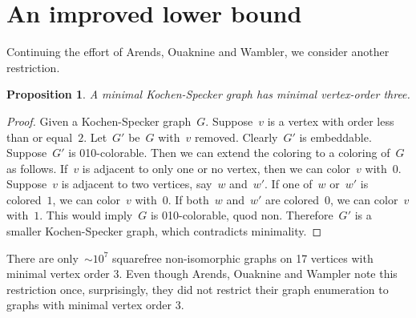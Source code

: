 \documentclass[adraft,copyright,creativecommons]{eptcs}
\newcounter{main}
\newtheorem{prop}[main]{Proposition}
\theoremstyle{definition}
\theoremstyle{remark}
\begin{document}
\section{An improved lower bound}
\label{sec:ilb}
Continuing the effort of Arends, Ouaknine and Wambler,
we consider another restriction.
\begin{prop}
    A minimal Kochen-Specker graph has minimal vertex-order three.
\end{prop}
\begin{proof}
    Given a Kochen-Specker graph~$G$.
    Suppose~$v$ is a vertex with order less than or equal~$2$.
    Let~$G'$ be~$G$ with~$v$ removed.
    Clearly~$G'$ is embeddable.
    Suppose~$G'$ is 010-colorable.
    Then we can extend the coloring to a coloring of~$G$ as follows.
    If~$v$ is adjacent to only one or no vertex,
    then we can color~$v$ with~$0$.
    Suppose~$v$ is adjacent to two vertices, say~$w$ and~$w'$.
    If one of~$w$ or~$w'$ is colored~$1$, we can color~$v$ with~$0$.
    If both~$w$ and~$w'$ are colored~$0$, we can color~$v$ with~$1$.
    This would imply~$G$ is 010-colorable, quod non.
    Therefore~$G'$ is a smaller
    Kochen-Specker graph, which contradicts minimality.
\end{proof}
There are only~${\sim}10^7$
squarefree non-isomorphic graphs on 17 vertices with minimal vertex order 3.
Even though Arends, Ouaknine and Wampler
note this restriction once,
surprisingly, they did not restrict their graph enumeration
to graphs with minimal vertex order 3.
\end{document}
